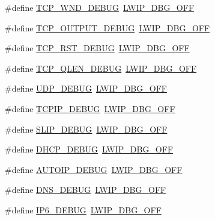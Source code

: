 \begin{DoxyCompactItemize}
\item 
\#define \hyperlink{group__lwip__opts__debugmsg_ga3704f433e947d6342da77c74e33627e1}{T\+C\+P\+\_\+\+W\+N\+D\+\_\+\+D\+E\+B\+UG}~\hyperlink{group__debugging__levels_gadab1cdc3f45939a3a5c9a3d7e04987e1}{L\+W\+I\+P\+\_\+\+D\+B\+G\+\_\+\+O\+FF}
\item 
\#define \hyperlink{group__lwip__opts__debugmsg_ga9f70601fdc1feee490772bf7fcdb74fb}{T\+C\+P\+\_\+\+O\+U\+T\+P\+U\+T\+\_\+\+D\+E\+B\+UG}~\hyperlink{group__debugging__levels_gadab1cdc3f45939a3a5c9a3d7e04987e1}{L\+W\+I\+P\+\_\+\+D\+B\+G\+\_\+\+O\+FF}
\item 
\#define \hyperlink{group__lwip__opts__debugmsg_ga37596f7bbb9b7663826244ba54486679}{T\+C\+P\+\_\+\+R\+S\+T\+\_\+\+D\+E\+B\+UG}~\hyperlink{group__debugging__levels_gadab1cdc3f45939a3a5c9a3d7e04987e1}{L\+W\+I\+P\+\_\+\+D\+B\+G\+\_\+\+O\+FF}
\item 
\#define \hyperlink{group__lwip__opts__debugmsg_gae7980c7f8eb45cd411bf410ff0a3fc55}{T\+C\+P\+\_\+\+Q\+L\+E\+N\+\_\+\+D\+E\+B\+UG}~\hyperlink{group__debugging__levels_gadab1cdc3f45939a3a5c9a3d7e04987e1}{L\+W\+I\+P\+\_\+\+D\+B\+G\+\_\+\+O\+FF}
\item 
\#define \hyperlink{group__lwip__opts__debugmsg_ga0393f312c5475a1c649b39ef9cfcaad4}{U\+D\+P\+\_\+\+D\+E\+B\+UG}~\hyperlink{group__debugging__levels_gadab1cdc3f45939a3a5c9a3d7e04987e1}{L\+W\+I\+P\+\_\+\+D\+B\+G\+\_\+\+O\+FF}
\item 
\#define \hyperlink{group__lwip__opts__debugmsg_ga52d6c83451936c3de3b0338d4a3f921f}{T\+C\+P\+I\+P\+\_\+\+D\+E\+B\+UG}~\hyperlink{group__debugging__levels_gadab1cdc3f45939a3a5c9a3d7e04987e1}{L\+W\+I\+P\+\_\+\+D\+B\+G\+\_\+\+O\+FF}
\item 
\#define \hyperlink{group__lwip__opts__debugmsg_gab986f95183559d8678c6d80969b01857}{S\+L\+I\+P\+\_\+\+D\+E\+B\+UG}~\hyperlink{group__debugging__levels_gadab1cdc3f45939a3a5c9a3d7e04987e1}{L\+W\+I\+P\+\_\+\+D\+B\+G\+\_\+\+O\+FF}
\item 
\#define \hyperlink{group__lwip__opts__debugmsg_ga97927ceecabcdb5f41735bf372a05cee}{D\+H\+C\+P\+\_\+\+D\+E\+B\+UG}~\hyperlink{group__debugging__levels_gadab1cdc3f45939a3a5c9a3d7e04987e1}{L\+W\+I\+P\+\_\+\+D\+B\+G\+\_\+\+O\+FF}
\item 
\#define \hyperlink{group__lwip__opts__debugmsg_gafaee522e7f32d81022215e1805e303a5}{A\+U\+T\+O\+I\+P\+\_\+\+D\+E\+B\+UG}~\hyperlink{group__debugging__levels_gadab1cdc3f45939a3a5c9a3d7e04987e1}{L\+W\+I\+P\+\_\+\+D\+B\+G\+\_\+\+O\+FF}
\item 
\#define \hyperlink{group__lwip__opts__debugmsg_gaba55da2352c99d813767913e5e36be1f}{D\+N\+S\+\_\+\+D\+E\+B\+UG}~\hyperlink{group__debugging__levels_gadab1cdc3f45939a3a5c9a3d7e04987e1}{L\+W\+I\+P\+\_\+\+D\+B\+G\+\_\+\+O\+FF}
\item 
\#define \hyperlink{group__lwip__opts__debugmsg_gac2f9726756b78d4d7c425b0422a776ce}{I\+P6\+\_\+\+D\+E\+B\+UG}~\hyperlink{group__debugging__levels_gadab1cdc3f45939a3a5c9a3d7e04987e1}{L\+W\+I\+P\+\_\+\+D\+B\+G\+\_\+\+O\+FF}
\end{DoxyCompactItemize}



